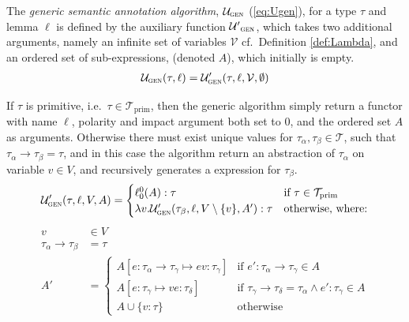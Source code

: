 \begin{definition}
	The \emph{generic semantic annotation algorithm}, $\mathcal{U}_\textsc{gen}$ (\ref{eq:Ugen}), for a type $\tau$ and lemma $\ell$ is defined by the auxiliary function $\mathcal{U'}_\textsc{gen}$, which takes two additional arguments, namely an infinite set of variables $\mathcal{V}$ cf.\ Definition \ref{def:Lambda}, and an ordered set of sub-expressions, (denoted $A$), which initially is empty.
\begin{align}
	\mathcal{U}_\textsc{gen}(\tau, \ell) = \mathcal{U}'_\textsc{gen}(\tau, \ell, \mathcal{V}, \emptyset)
	\label{eq:Ugen}
\end{align}
\vspace{-1.5em}

If $\tau$ is primitive, i.e.\ $\tau \in \mathcal{T}_\mathrm{prim}$, then the generic algorithm simply return a functor with name $\ell$, polarity and impact argument both set to $0$, and the ordered set $A$ as arguments. Otherwise there must exist unique values for $\tau_\alpha, \tau_\beta \in \mathcal{T}$, such that $\tau_\alpha \to \tau_\beta = \tau$, and in this case the algorithm return an abstraction of $\tau_\alpha$ on variable $v \in V$, and recursively generates a expression for $\tau_\beta$.
\begin{align*}
	\mathcal{U}'_\textsc{gen}(\tau, \ell,V,A) =
	\begin{cases}
	 \ell_0^0(A) : \tau	&\text{if $\tau \in \mathcal{T}_\mathrm{prim}$} \\	
	 \lambda v . \mathcal{U}'_\textsc{gen}(\tau_\beta, \ell, V \setminus \{v \}, A') : \tau
	&\text{otherwise, where:} %
	\end{cases}
\end{align*}
\begin{align*}
	v &\in V\\
	\tau_\alpha \to \tau_\beta &= \tau\\
	A' &=
	\begin{cases}
    A [e : \tau_\alpha \to \tau_\gamma \mapsto e v : \tau_\gamma ] & \text{if $e' : \tau_\alpha \to \tau_\gamma \in A$} \\ %
    A [e : \tau_\gamma \mapsto v e : \tau_\delta ] & \text{if $\tau_\gamma \to \tau_\delta = \tau_\alpha \wedge e' : \tau_\gamma \in A$}\\
    A \cup \{v : \tau\} & \text{otherwise}
	\end{cases}

\end{align*}
\end{definition}

